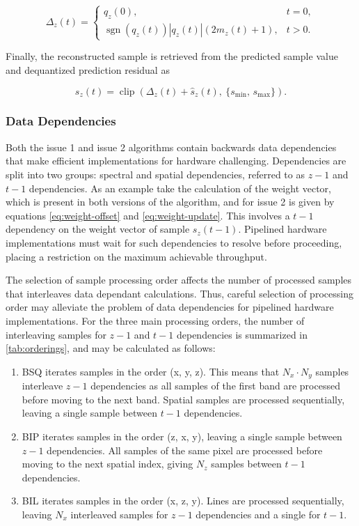 \begin{equation}
	\Delta_z(t) =
	\begin{cases}
		q_z(0),                                             & t = 0, \\
		\operatorname{sgn}(q_z(t)) |q_z(t)| (2 m_z(t) + 1), & t > 0.
	\end{cases}
	\label{eq:dequantization}
\end{equation}

Finally, the reconstructed sample is retrieved from the predicted sample value and dequantized prediction residual as

\begin{equation}
	s_z(t) = \operatorname{clip}\!\left( \Delta_z(t) + \hat{s}_z(t),\ \{s_{\min},\, s_{\max}\} \right).
	\label{eq:reconstruced-sample}
\end{equation}

\subsubsection{Data Dependencies}

Both the issue 1 and issue 2 algorithms contain backwards data dependencies that make efficient implementations for hardware challenging. Dependencies are split into two groups: spectral and spatial dependencies, referred to as $z-1$ and $t-1$ dependencies. As an example take the calculation of the weight vector, which is present in both versions of the algorithm, and for issue 2 is given by equations \ref{eq:weight-offset} and \ref{eq:weight-update}. This involves a $t-1$ dependency on the weight vector of sample $s_z(t-1)$. Pipelined hardware implementations must wait for such dependencies to resolve before proceeding, placing a restriction on the maximum achievable throughput.

The selection of sample processing order affects the number of processed samples that interleaves data dependant calculations. Thus, careful selection of processing order may alleviate the problem of data dependencies for pipelined hardware implementations. For the three main processing orders, the number of interleaving samples for $z-1$ and $t-1$ dependencies is summarized in \autoref{tab:orderings}, and may be calculated as follows:

\begin{enumerate}
	\item \acrshort{BSQ} iterates samples in the order (x, y, z). This means that $N_x \cdot N_y$ samples interleave $z-1$ dependencies as all samples of the first band are processed before moving to the next band. Spatial samples are processed sequentially, leaving a single sample between $t-1$ dependencies.
	\item \acrshort{BIP} iterates samples in the order (z, x, y), leaving a single sample between $z-1$ dependencies. All samples of the same pixel are processed before moving to the next spatial index, giving $N_z$ samples between $t-1$ dependencies.
	\item \acrshort{BIL} iterates samples in the order (x, z, y). Lines are processed sequentially, leaving $N_x$ interleaved samples for $z-1$ dependencies and a single for $t-1$.
\end{enumerate}

